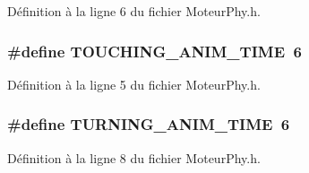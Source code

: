 Définition à la ligne 6 du fichier MoteurPhy.h.

\hypertarget{a00031_a6c427fbb0cf8ed847dc036610f22b816}{
\subsubsection[{TOUCHING\_\-ANIM\_\-TIME}]{\setlength{\rightskip}{0pt plus 5cm}\#define TOUCHING\_\-ANIM\_\-TIME~6}}
\label{a00031_a6c427fbb0cf8ed847dc036610f22b816}


Définition à la ligne 5 du fichier MoteurPhy.h.

\hypertarget{a00031_a948ba274d12951fb0a9306a4d36cf2c7}{
\subsubsection[{TURNING\_\-ANIM\_\-TIME}]{\setlength{\rightskip}{0pt plus 5cm}\#define TURNING\_\-ANIM\_\-TIME~6}}
\label{a00031_a948ba274d12951fb0a9306a4d36cf2c7}


Définition à la ligne 8 du fichier MoteurPhy.h.

